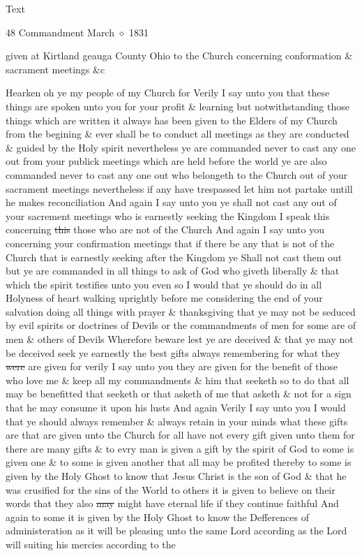 			\begin{description}
				\item[Text]
			\end{description}
			
				\begin{tightcenter}
				48 Commandment March $\diamond$ 1831
				\end{tightcenter}
				
				given at Kirtland geauga County Ohio to the Church concerning conformation \& sacrament meetings \&c
				
				Hearken oh ye my people of my Church for Verily I say unto you that these things are spoken unto you for your profit \& learning but notwithstanding those things which are written it always has been given to the Elders of my Church from the begining \& ever shall be to conduct all meetings as they are conducted \& guided by the Holy spirit nevertheless ye are commanded never to cast any one out from your publick meetings which are held before the world ye are also commanded never to cast any one out who belongeth to the Church out of your sacrament meetings nevertheless if any have trespassed let him not partake untill he makes reconciliation And again I say unto you ye shall not cast any out of your sacrement meetings who is earnestly seeking the Kingdom I speak this concerning \sout{this} those who are not of the Church And again I say unto you concerning your confirmation meetings that if there be any that is not of the Church that is earnestly seeking after the Kingdom ye Shall not cast them out but ye are commanded in all things to ask of God who giveth liberally \& that which the spirit testifies unto you even so I would that ye should do in all Holyness of heart walking uprightly before me considering the end of your salvation doing all things with prayer \& thanksgiving that ye may not be seduced by evil spirits or doctrines of Devils or the commandments of men for some are of men \& others of Devils Wherefore beware lest ye are deceived \& that ye may not be deceived seek ye earnestly the best gifts always remembering for what they \sout{were} are given for verily I say unto you they are given for the benefit of those who love me \& keep all my commandments \& him that seeketh so to do that all may be benefitted that seeketh or that asketh of me that asketh \& not for a sign that he may consume it upon his lusts And again Verily I say unto you I would that ye should always remember \& always retain in your minds what these gifts are that are given unto the Church for all have not every gift given unto them for there are many gifts \& to evry man is given a gift by the spirit of God to some is given one \& to some is given another that all may be profited thereby to some is given by the Holy Ghost to know that Jesus Christ is the son of God \& that he was crusified for the sins of the World to others it is given to believe on their words that they also \sout{may} might have eternal life if they continue faithful And again to some it is given by the Holy Ghost to know the Defferences of administeration as it will be pleasing unto the same Lord according as the Lord will suiting his mercies according to the 